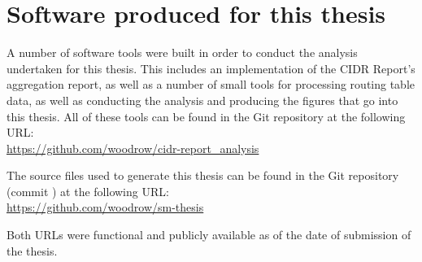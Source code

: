 \chapter{Software produced for this thesis}
\label{chap:opensource}

A number of software tools were built in order to conduct the analysis undertaken for this thesis. This includes an implementation of the CIDR Report's aggregation report, as well as a number of small tools for processing routing table data, as well as conducting the analysis and producing the figures that go into this thesis. All of these tools can be found in the Git repository at the following URL:\\
\indent \url{https://github.com/woodrow/cidr-report_analysis}

\vspace{1em}
\noindent The source files used to generate this thesis can be found in the Git repository (commit \GITHash) at the following URL:\\
\indent \url{https://github.com/woodrow/sm-thesis}

\vspace{1em}
\noindent Both URLs were functional and publicly available as of the date of submission of the thesis.

